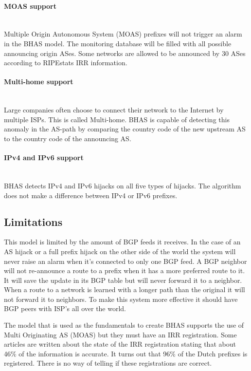 \paragraph{MOAS support}\label{par:moassupport}\mbox{}\\
Multiple Origin Autonomous System (MOAS) prefixes will not trigger an alarm in the BHAS model. The monitoring database will be filled with all possible announcing origin ASes. Some networks are allowed to be announced by 30 ASes according to RIPEstats IRR information.

\paragraph{Multi-home support}\label{par:multihomesupport}\mbox{}\\
Large companies often choose to connect their network to the Internet by multiple ISPs. This is called Multi-home. BHAS is capable of detecting this anomaly in the AS-path by comparing the country code of the new upstream AS to the country code of the announcing AS.

\paragraph{IPv4 and IPv6 support}\label{par:ipv4andipv6support}\mbox{}\\
BHAS detects IPv4 and IPv6 hijacks on all five types of hijacks. The algorithm does not make a difference between IPv4 or IPv6 prefixes.  

\subsection{Limitations}\label{subsec:limitations}
This model is limited by the amount of BGP feeds it receives. In the case of an AS hijack or a full prefix hijack on the other side of the world the system will never raise an alarm when it's connected to only one BGP feed. A BGP neighbor will not re-announce a route to a prefix when it has a more preferred route to it. It will save the update in its BGP table but will never forward it to a neighbor. When a route to a network is learned with a longer path than the original it will not forward it to neighbors. To make this system more effective it should have BGP peers with ISP's all over the world. \par

The model that is used as the fundamentals to create BHAS supports the use of Multi Originating AS (MOAS) but they must have an IRR registration. Some articles are written about the state of the IRR registration \cite{irraccuracy, routehygiene} stating that about 46\% of the information is accurate. It turns out that 96\% of the Dutch prefixes is registered. There is no way of telling if these registrations are correct.


